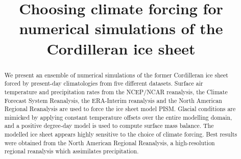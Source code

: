 \documentclass[tc, ms, noauthor]{copernicus}
\begin{document}
\title{Choosing climate forcing for numerical simulations of the Cordilleran ice sheet}


\received{}
\pubdiscuss{}
\revised{}
\accepted{}
\published{}

\maketitle

\begin{abstract}
We present an ensemble of numerical simulations of the former Cordilleran ice sheet forced by present-day climatologies from five different datasets. Surface air temperature and precipitation rates from the NCEP/NCAR reanalysis, the Climate Forecast System Reanalysis, the ERA-Interim reanalysis and the North American Regional Reanalysis are used to force the ice sheet model PISM. Glacial conditions are mimicked by applying constant temperature offsets over the entire modelling domain, and a positive degree-day model is used to compute surface mass balance. The modelled ice sheet appears highly sensitive to the choice of climate forcing. Best results were obtained from the North American Regional Reanalysis, a high-resolution regional reanalysis which assimilates precipitation.
\end{abstract}







\conclusions  %
\label{sec:conclusion}




\end{document}
